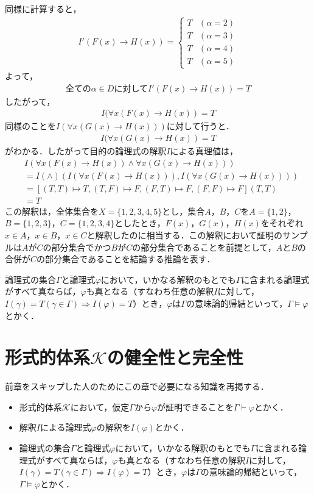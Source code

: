 \documentclass[10pt,b5paper,papersize,dvipdfmx]{jsbook}
\begin{document}
同様に計算すると，
\begin{align*}
I'(F(x)\to H(x))=
\begin{cases}
T&(\alpha = 2)\\
T&(\alpha = 3)\\
T&(\alpha = 4)\\
T&(\alpha = 5)
\end{cases}
\end{align*}
よって，
\begin{align*}
\mbox{全ての}\alpha \in D\mbox{に対して}I'(F(x)\to H(x))=T
\end{align*}
したがって，
\begin{align*}
I(\forall x(F(x)\to H(x))=T
\end{align*}
同様のことを$I(\forall x(G(x)\to H(x)))$に対して行うと．
\begin{align*}
I(\forall x(G(x)\to H(x))=T
\end{align*}
がわかる．したがって目的の論理式の解釈$I$による真理値は，
\begin{align*}
&I(\forall x(F(x)\to H(x))\land \forall x(G(x)\to H(x)))\\
&=I(\land)(I(\forall x(F(x)\to H(x))),I(\forall x(G(x)\to H(x))))\\
&=[(T,T)\mapsto T,(T,F)\mapsto F,(F,T)\mapsto F,(F,F)\mapsto F](T,T)\\
&=T
\end{align*}
この解釈は，全体集合を$X=\{1,2,3,4,5\}$とし，集合$A$，$B$，$C$を$A=\{1,2\}$，$B=\{1,2,3\}$，$C=\{1,2,3,4\}$としたとき，$F(x)$，$G(x)$，$H(x)$をそれぞれ$x\in A$，$x\in B$，$x\in C$と解釈したのに相当する．この解釈において証明のサンプルは$A$が$C$の部分集合でかつ$B$が$C$の部分集合であることを前提として，$A$と$B$の合併が$C$の部分集合であることを結論する推論を表す．\par
論理式の集合$\Gamma$と論理式$\varphi$において，いかなる解釈のもとでも$\Gamma$に含まれる論理式がすべて真ならば，$\varphi$も真となる（すなわち任意の解釈$I$に対して，$I(\gamma)=T(\gamma \in \Gamma)\Rightarrow I(\varphi)=T$）とき，$\varphi$は$\Gamma$の意味論的帰結といって，$\Gamma \models \varphi$とかく．

\section{形式的体系$\mathcal K$の健全性と完全性}
前章をスキップした人のためにこの章で必要になる知識を再掲する．
\begin{itemize}
\item 形式的体系$\mathcal K$において，仮定$\Gamma$から$\varphi$が証明できることを$\Gamma \vdash \varphi$とかく．
\item 解釈$I$による論理式$\varphi$の解釈を$I(\varphi)$とかく．
\item 論理式の集合$\Gamma$と論理式$\varphi$において，いかなる解釈のもとでも$\Gamma$に含まれる論理式がすべて真ならば，$\varphi$も真となる（すなわち任意の解釈$I$に対して，$I(\gamma)=T(\gamma \in \Gamma)\Rightarrow I(\varphi)=T$）とき，$\varphi$は$\Gamma$の意味論的帰結といって，$\Gamma \models \varphi$とかく．
\end{itemize}
\end{document}
